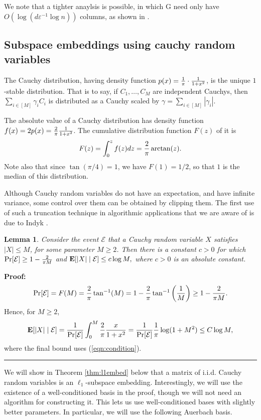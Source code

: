 \documentclass[11pt]{article}
\newtheorem{lemma}[theorem]{Lemma}
\newenvironment{proof}{\begin{trivlist} \item {\bf Proof:~~}}
  {\qed\end{trivlist}}
\newcommand{\mat}[1]{{\ensuremath{\bm{\mathrm{#1}}}}}
\def\matG{\mat{G}}
\def\frac#1#2{{#1\over #2}}
\def\qed{\hfill\rule{2mm}{2mm}}
\newcommand{\eps}{\varepsilon}
\begin{document}
We note that a tighter anaylsis is possible, in which $\matG$ need only have $O(\log(d \eps^{-1} \log n))$ columns, as shown 
in \cite{CDMMMW13}. 

\subsection{Subspace embeddings using cauchy random variables}\label{sec:cauchy}
The Cauchy distribution, having density function 
$p(x)=\frac{1}{\pi} \cdot \frac{1}{1+x^2}$, 
is the unique $1$-stable distribution.
That is to say, if $C_1,\ldots,C_M$ are independent Cauchys, then 
$\sum_{i\in[M]}\gamma_iC_i$ is distributed as a Cauchy scaled by
$\gamma=\sum_{i\in[M]}|\gamma_i|$.

The absolute value of a Cauchy distribution has density function $f(x) = 2p(x) = \frac{2}{\pi} \frac{1}{1+x^2}$.
The cumulative distribution function $F(z)$ of it is
$$F(z) = \int_0^z f(z) dz = \frac{2}{\pi} \arctan(z).$$
Note also that since $\tan(\pi/4) = 1$, we have $F(1) = 1/2$, so that $1$ is the median of this distribution. 

Although Cauchy random variables do not have an expectation, and have infinite variance, some control over them can be
obtained by clipping them. The first use of such a truncation 
technique in algorithmic applications that we are aware of
is due to Indyk \cite{i06}. 

\begin{lemma}\label{lem:truncated}
Consider the event $\mathcal{E}$ that a Cauchy random variable $X$ satisfies
$|X| \leq M$, for some parameter $M \geq 2$. Then there is a constant $c> 0$ for which 
$\Pr[\mathcal{E}] \geq 1- \frac{2}{\pi M}$ and ${\bf E}[|X| \mid \mathcal{E}] \leq c \log M,$
where $c > 0$ is an absolute constant.  
\end{lemma}
\begin{proof}
\begin{eqnarray}\label{eqn:condition}
\Pr[\mathcal{E}] = F(M) = \frac{2}{\pi} \tan^{-1}(M) = 1-\frac{2}{\pi} \tan^{-1} \left (\frac{1}{M} \right ) \geq 1- \frac{2}{\pi M}.
\end{eqnarray}
Hence, for $M \geq 2$, 
\begin{eqnarray*}\label{eqn:expectation}
{\bf E}[|X| \mid \mathcal{E}] = \frac{1}{\Pr[\mathcal{E}]} \int_{0}^M \frac{2}{\pi} \frac{x}{1+x^2}
= \frac{1}{\Pr[\mathcal{E}]} \frac{1}{\pi} \log(1+M^2)
\leq C \log M,
\end{eqnarray*}
where the final bound uses (\ref{eqn:condition}). 
\end{proof}
We will show in Theorem \ref{thm:l1embed} below 
that a matrix of i.i.d. Cauchy random variables is an $\ell_1$-subspace embedding. Interestingly, we will use the existence of a
well-conditioned basis in the proof, though we will not need an algorithm for constructing it. This lets us use well-conditioned bases with
slightly better parameters. In particular, we will use the following Auerbach basis.
\end{document}
